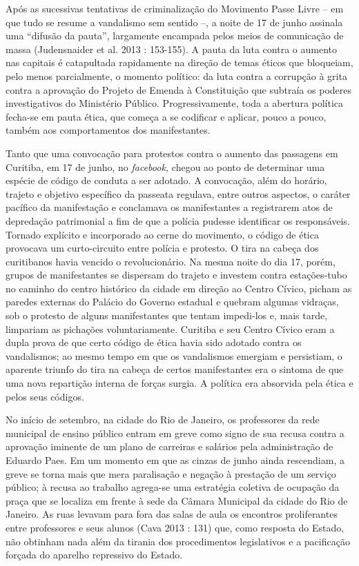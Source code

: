 Após as sucessivas tentativas de
criminalização do Movimento Passe Livre -- em que tudo se resume a
vandalismo sem sentido --, a noite de 17 de junho assinala uma ``difusão
da pauta'', largamente encampada pelos meios de comunicação de massa
(Judensnaider et al. 2013 : 153-155). A pauta da luta contra o aumento
nas capitais é catapultada rapidamente na direção de temas éticos que
bloqueiam, pelo menos parcialmente, o momento político: da luta contra a
corrupção à grita contra a aprovação do Projeto de Emenda à Constituição
que subtraía os poderes investigativos do Ministério Público.
Progressivamente, toda a abertura política fecha-se em pauta ética, que
começa a se codificar e aplicar, pouco a pouco, também aos
comportamentos dos manifestantes.

Tanto que uma convocação para protestos contra o aumento das passagens
em Curitiba, em 17 de junho, no \emph{facebook,} chegou ao ponto de
determinar uma espécie de código de conduta a ser adotado. A convocação,
além do horário, trajeto e objetivo específico da passeata regulava,
entre outros aspectos, o caráter pacífico da manifestação e conclamava
os manifestantes a registrarem atos de depredação patrimonial a fim de
que a polícia pudesse identificar os responsáveis. Tornado explícito e
incorporado ao cerne do movimento, o código de ética provocava um
curto-circuito entre polícia e protesto. O tira na cabeça dos
curitibanos havia vencido o revolucionário. Na mesma noite do dia 17,
porém, grupos de manifestantes se dispersam do trajeto e investem contra
estações-tubo no caminho do centro histórico da cidade em direção ao
Centro Cívico, picham as paredes externas do Palácio do Governo estadual
e quebram algumas vidraças, sob o protesto de alguns manifestantes que
tentam impedi-los e, mais tarde, limpariam as pichações voluntariamente.
Curitiba e seu Centro Cívico eram a dupla prova de que certo código de
ética havia sido adotado contra os vandalismos; ao mesmo tempo em que os
vandalismos emergiam e persistiam, o aparente triunfo do tira na cabeça
de certos manifestantes era o sintoma de que uma nova repartição interna
de forças surgia. A política era absorvida pela ética e pelos seus
códigos.

No início de setembro, na cidade do Rio de Janeiro, os professores da
rede municipal de ensino público entram em greve como signo de sua
recusa contra a aprovação iminente de um plano de carreiras e salários
pela administração de Eduardo Paes. Em um momento em que as cinzas de
junho ainda rescendiam, a greve se torna mais que mera paralisação e
negação à prestação de um serviço público; à recusa ao trabalho
agrega-se uma estratégia coletiva de ocupação da praça que se localiza
em frente à sede da Câmara Municipal da cidade do Rio de Janeiro. As
ruas levavam para fora das salas de aula os encontros proliferantes
entre professores e seus alunos (Cava 2013 : 131) que, como resposta do
Estado, não obtinham nada além da tirania dos procedimentos legislativos
e a pacificação forçada do aparelho repressivo do Estado.

